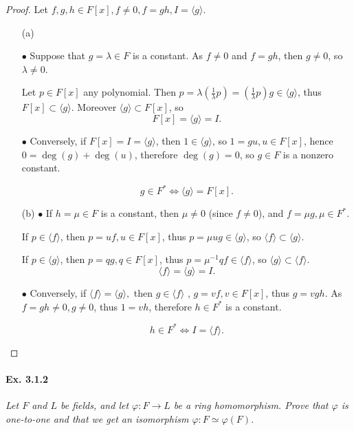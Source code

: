 \documentclass[11pt,a4paper]{article}
\begin{document}
\begin{proof}
Let $f,g,h \in F[x], f\neq 0, f=gh, I = \langle g \rangle$.
\begin{enumerate}
\item[(a)]

$\bullet$ Suppose that  $g = \lambda \in F$ is a constant. As $f \neq 0$ and $f = gh$, then $g\ne 0$, so $\lambda \neq 0$. 

Let $p \in F[x]$ any polynomial. Then $p = \lambda (\frac{1}{\lambda} p ) = (\frac{1}{\lambda} p )  g \in \langle g \rangle$, thus $F[x] \subset \langle g \rangle$. Moreover $\langle g \rangle \subset F[x]$, so $$F[x] = \langle g \rangle = I.$$

$\bullet$ Conversely, if $F[x] = I = \langle g \rangle$, then $ 1 \in \langle g \rangle$, so $1 = g u, u \in F[x]$, hence $0 = \deg(g)+\deg(u)$, therefore $\deg(g) = 0$, so $g \in F$ is a nonzero constant.


$$g \in F^* \iff \langle g \rangle = F[x].$$

\item[(b)] $\bullet$ If $h = \mu \in F$ is a constant, then $\mu\neq 0$ (since $f\ne 0$), and $f =\mu g, \mu \in F^*$.

If $p \in \langle f \rangle$, then $p = u f, u \in F[x]$, thus  $p = \mu u g \in \langle g \rangle$, so $\langle f \rangle \subset \langle g \rangle$.

If $p \in \langle g \rangle$, then $p = q g, q \in F[x]$, thus $p = \mu^{-1} q f \in \langle f \rangle$, so $\langle g \rangle \subset \langle f \rangle$.
$$\langle f \rangle = \langle g \rangle = I.$$

$\bullet$ Conversely, if $\langle f \rangle = \langle g \rangle,$  then $g \in \langle f \rangle$ , $g = v f, v \in F[x]$, thus $g = v gh$. As $f = gh\neq 0, g \neq 0$, thus $1 = vh$, therefore $h \in F^*$ is a constant.

$$h \in F^* \iff I =\langle f \rangle.$$

\end{enumerate}
\end{proof}

\paragraph{Ex. 3.1.2}

{\it Let $F$ and $L$ be fields, and let $\varphi : F \to L$ be a ring homomorphism. Prove that $\varphi$ is one-to-one and that we get an isomorphism $\varphi : F \simeq \varphi(F)$.
}
\end{document}
